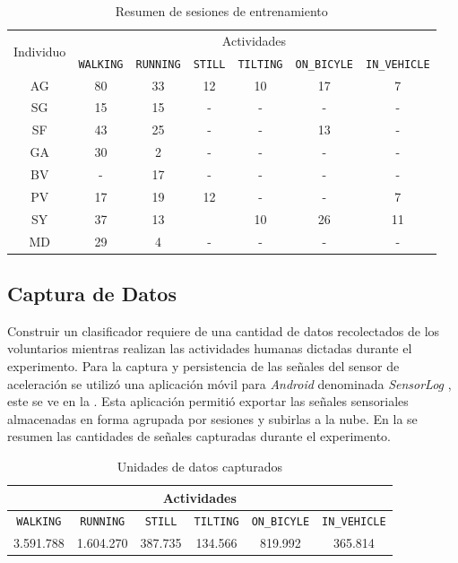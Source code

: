 \begin{table}[h]
\begin{centering}
\begin{tabular}{|c|c|c|c|c|c|c|}
\hline 
\multirow{2}{*}{Individuo} & \multicolumn{6}{c|}{Actividades}\tabularnewline
\cline{2-7} 
 & \texttt{\footnotesize{}WALKING} & \texttt{\footnotesize{}RUNNING} & \texttt{\footnotesize{}STILL} & \texttt{\footnotesize{}TILTING} & \texttt{\footnotesize{}ON\_BICYLE} & \texttt{\footnotesize{}IN\_VEHICLE}\tabularnewline
\hline 
\hline 
AG & 80 & 33 & 12 & 10 & 17 & 7\tabularnewline
\hline 
SG & 15 & 15 & - & - & - & -\tabularnewline
\hline 
SF & 43 & 25 & - & - & 13 & -\tabularnewline
\hline 
GA & 30 & 2 & - & - & - & -\tabularnewline
\hline 
BV & - & 17 & - & - & - & -\tabularnewline
\hline 
PV & 17 & 19 & 12 & - & - & 7\tabularnewline
\hline 
SY & 37 & 13 &  & 10 & 26 & 11\tabularnewline
\hline 
MD & 29 & 4 & - & - & - & -\tabularnewline
\hline 
\end{tabular}
\par\end{centering}
\caption{\label{tab6:sesiones}Resumen de sesiones de entrenamiento}
\end{table}


\subsection{Captura de Datos}

Construir un clasificador requiere de una cantidad de datos recolectados
de los voluntarios mientras realizan las actividades humanas dictadas
durante el experimento. Para la captura y persistencia de las señales
del sensor de aceleración se utilizó una aplicación móvil para \emph{Android
}denominada \emph{SensorLog} \cite{Alan2014s}, este se ve en la .
Esta aplicación permitió exportar las señales sensoriales almacenadas
en forma agrupada por sesiones y subirlas a la nube. En la 
se resumen las cantidades de señales capturadas durante el experimento.

\begin{table}[h]
\begin{centering}
\begin{tabular}{|c|c|c|c|c|c|}
\hline 
\multicolumn{6}{|c|}{Actividades}\tabularnewline
\hline 
\texttt{\footnotesize{}WALKING} & \texttt{\footnotesize{}RUNNING} & \texttt{\footnotesize{}STILL} & \texttt{\footnotesize{}TILTING} & \texttt{\footnotesize{}ON\_BICYLE} & \texttt{\footnotesize{}IN\_VEHICLE}\tabularnewline
\hline 
\hline 
3.591.788 & 1.604.270 & 387.735 & 134.566 & 819.992 & 365.814\tabularnewline
\hline 
\end{tabular}
\par\end{centering}
\caption{\label{tab6:captura}Unidades de datos capturados}
\end{table}


